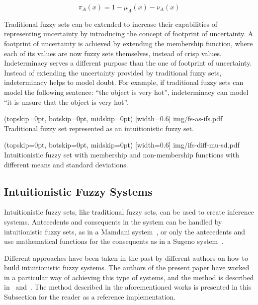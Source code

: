 \documentclass{ieeeaccess}
\begin{document}
\begin{equation}
  \label{eq:indeterminacy}
  \pi_{A}(x) = 1 - \mu_{A}(x) - \nu_{A}(x)
\end{equation}

Traditional fuzzy sets can be extended to increase their capabilities of
representing uncertainty by introducing the concept of footprint of
uncertainty. A footprint of uncertainty is achieved by extending the membership
function, where each of its values are now fuzzy sets themselves, instead of
crisp values. Indeterminacy serves a different purpose than the one of footprint
of uncertainty. Instead of extending the uncertainty provided by traditional
fuzzy sets, indeterminacy helps to model doubt. For example, if traditional
fuzzy sets can model the following sentence: ``the object is very hot'',
indeterminacy can model ``it is unsure that the object is very hot''.

\Figure[](topskip=0pt, botskip=0pt, midskip=0pt)
[width=0.6\linewidth]
{img/fs-as-ifs.pdf}
{Traditional fuzzy set represented as an intuitionistic fuzzy set.
  \label{figure:fs-as-ifs}}

\Figure[](topskip=0pt, botskip=0pt, midskip=0pt)
[width=0.6\linewidth]
{img/ifs-diff-mu-sd.pdf}
{Intuitionistic fuzzy set with membership and non-membership functions with different means and standard deviations.
  \label{figure:ifs-diff-mu-sd}}

\subsection{Intuitionistic Fuzzy Systems}
\label{subsection:intuitionistic-fuzzy-systems}

Intuitionistic fuzzy sets, like traditional fuzzy sets, can be used to create
inference systems. Antecedents and consequents in the system can be handled by
intuitionistic fuzzy sets, as in a Mamdani system~\cite{Mamdani1975}, or only
the antecedents and use mathematical functions for the consequents as in a
Sugeno system~\cite{Takagi1985}.

Different approaches have been taken in the past by different authors on how to
build intuitionistic fuzzy systems. The authors of the present paper have worked
in a particular way of achieving this type of systems, and the method is
described in~\cite{Hernandez-Aguila2016} and~\cite{Hernandez-Aguila2017-2}. The
method described in the aforementioned works is presented in this Subsection for
the reader as a reference implementation.
\end{document}
